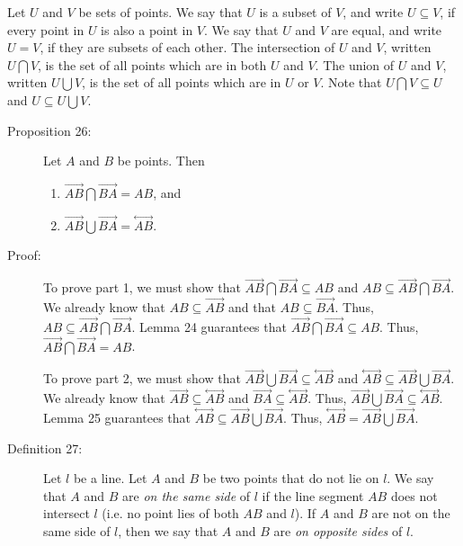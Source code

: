 \documentclass{article}
\newcommand{\linethrough}[1]{\stackrel{\longleftrightarrow}{#1} }
\newcommand{\ray}[1]{\stackrel{\longrightarrow}{#1} }
\begin{document}
Let $U$ and $V$ be sets of points. We say that $U$ is a subset of $V$, and write $U \subseteq V$, if every point in $U$ is also a point in $V$. We say that $U$ and $V$ are equal, and write $U=V$, if they are subsets of each other. The intersection of $U$ and $V$, written $U \bigcap V$, is the set of all points which are in both $U$ and $V$. The union of $U$ and $V$, written $U \bigcup V$, is the set of all points which are in $U$ or $V$. Note that $U \bigcap V \subseteq U$ and $U \subseteq U \bigcup V$.

\begin{description}

\item[Proposition 26:] Let $A$ and $B$ be points. Then
\begin{enumerate}[\hspace{1cm}1.]
  \item $\ray{AB} \bigcap \ray{BA} = AB$, and
  \item $\ray{AB} \bigcup \ray{BA} = \linethrough{AB}$.
\end{enumerate}

\item[Proof:] To prove part 1, we must show that $\ray{AB} \bigcap \ray{BA} \subseteq AB$ and $AB \subseteq \ray{AB} \bigcap \ray{BA}$. We already know that $AB \subseteq \ray{AB}$ and that $AB \subseteq \ray{BA}$. Thus, $AB \subseteq \ray{AB} \bigcap \ray{BA}$. Lemma 24 guarantees that $\ray{AB} \bigcap \ray{BA} \subseteq AB$. Thus, $\ray{AB} \bigcap \ray{BA} = AB$.

  To prove part 2, we must show that $\ray{AB} \bigcup \ray{BA} \subseteq \linethrough{AB}$ and $\linethrough{AB} \subseteq \ray{AB} \bigcup \ray{BA}$. We already know that $\ray{AB} \subseteq \linethrough{AB}$ and $\ray{BA} \subseteq \linethrough{AB}$. Thus, $\ray{AB} \bigcup \ray{BA} \subseteq \linethrough{AB}$. Lemma 25 guarantees that $\linethrough{AB} \subseteq \ray{AB} \bigcup \ray{BA}$. Thus, $\linethrough{AB} = \ray{AB} \bigcup \ray{BA}$.

\item[Definition 27:] Let $l$ be a line. Let $A$ and $B$ be two points that do not lie on $l$. We say that $A$ and $B$ are \emph{on the same side} of $l$ if the line segment $AB$ does not intersect $l$ (i.e. no point lies of both $AB$ and $l$). If $A$ and $B$ are not on the same side of $l$, then we say that $A$ and $B$ are \emph{on opposite sides} of $l$.

\end{description}
\end{document}
